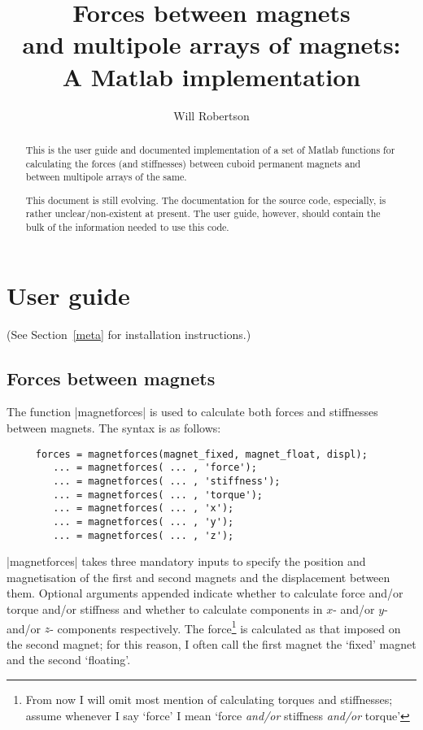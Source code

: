 \documentclass{article}
\begin{document}
\title{Forces between magnets\\ and multipole arrays of magnets:\\ A Matlab implementation}
\author{Will Robertson}
\maketitle
\vfil
\begin{abstract}
This is the user guide and documented implementation of a set of
Matlab functions for calculating the forces (and stiffnesses) between
cuboid permanent magnets and between multipole arrays of the same.

This document is still evolving. The documentation for the source code,
especially, is rather unclear/non-existent at present. The user guide,
however, should contain the bulk of the information needed to use this code.
\end{abstract}

\newpage
\tableofcontents

\newpage

\section{User guide}

(See Section~\ref{meta} for installation instructions.)

\subsection{Forces between magnets}

The function |magnetforces| is used to calculate both forces and stiffnesses
between magnets. The syntax is as follows:

\begin{verbatim}
     forces = magnetforces(magnet_fixed, magnet_float, displ);
        ... = magnetforces( ... , 'force');
        ... = magnetforces( ... , 'stiffness');
        ... = magnetforces( ... , 'torque');
        ... = magnetforces( ... , 'x');
        ... = magnetforces( ... , 'y');
        ... = magnetforces( ... , 'z');
\end{verbatim}

|magnetforces| takes three mandatory inputs to specify the position and magnetisation of the first and second magnets and the displacement between them.
Optional arguments appended indicate whether to calculate force and/or torque and/or stiffness and whether to calculate components in $x$- and/or $y$- and/or $z$- components respectively.
The force\footnote{From now I will omit most mention of calculating torques and stiffnesses; assume whenever I say `force' I mean `force \emph{and/or} stiffness \emph{and/or} torque'} is calculated as that imposed on the second magnet; for this reason, I often call the first magnet the `fixed' magnet and the second `floating'.
\end{document}
